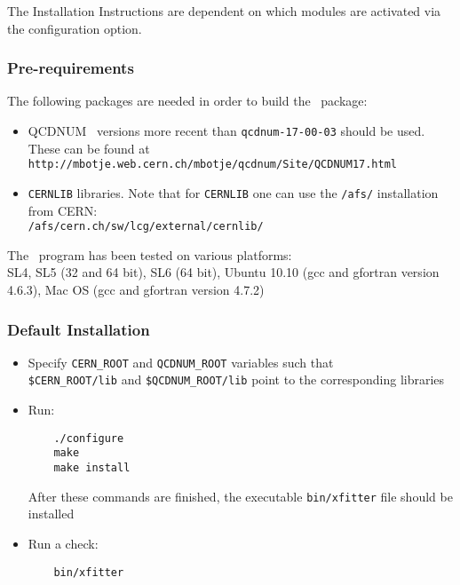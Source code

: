 
\label{sec:install}

The Installation Instructions are dependent on which modules are activated via the configuration option. 
\subsubsection{Pre-requirements}

The following packages are needed in order to build the \fitter\ package:
\begin{itemize}
\item QCDNUM~\cite{qcdnum} versions more recent than {\tt qcdnum-17-00-03} should be used. These can be found at \\
  {\tt http://mbotje.web.cern.ch/mbotje/qcdnum/Site/QCDNUM17.html}
\item {\tt CERNLIB} libraries. Note that for {\tt CERNLIB} one can use the {\tt /afs/} installation from CERN:\\
  {\tt /afs/cern.ch/sw/lcg/external/cernlib/}
\end{itemize}
The \fitter\ program has been tested on various platforms:\\
SL4, SL5 (32 and 64 bit), SL6 (64 bit),  Ubuntu 10.10 (gcc and gfortran version 4.6.3), Mac OS (gcc and gfortran version 4.7.2) 

\subsubsection{Default Installation}
\begin{itemize}
\item
 Specify {\tt CERN\_ROOT} 
     and {\tt QCDNUM\_ROOT} variables such that\\
     \verb'$CERN_ROOT/lib'  and \verb'$QCDNUM_ROOT/lib'
 point to the corresponding libraries
\item Run:
\begin{verbatim}
    ./configure
    make 
    make install
\end{verbatim}
After these commands are finished, the executable {\tt bin/xfitter} 
file should be installed
\item  Run a check:
\begin{verbatim}
    bin/xfitter 
\end{verbatim}
\end{itemize}
